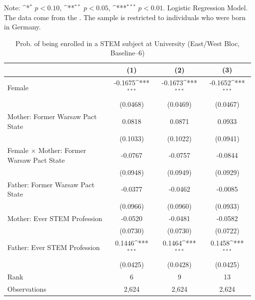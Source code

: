 \documentclass[a4paper, oneside, hyperfootnotes = false]{article}
\def\sym#1{\ifmmode^{#1}\else\(^{#1}\)\fi}
\begin{document}
{\begin{table}[ht]
\begin{center}
		\parbox{10cm}{
			\linespread{1}\footnotesize Note: \sym{*} \(p<0.10\), \sym{**} \(p<0.05\), \sym{***} \(p<0.01\). Logistic Regression Model. The data come from the \cite{SOEP2023}. The sample is restricted to individuals who were born in Germany.}
		
	\end{center}
\end{table}

\begin{table}[ht]
	\caption[STEM subject at University (East/West Bloc, Baseline--6)]{Prob. of being enrolled in a STEM subject at University (East/West Bloc, Baseline--6)}
	\label{tab:extension}
	\begin{center}
		\begin{tabular}{l*{3}{c}}
			\toprule
			&\multicolumn{1}{c}{(1)}         &\multicolumn{1}{c}{(2)}         &\multicolumn{1}{c}{(3)}         \\
			\midrule
			Female              &     -0.1675\sym{***}&     -0.1673\sym{***}&     -0.1652\sym{***}\\
			&    (0.0468)         &    (0.0469)         &    (0.0467)         \\
			\addlinespace
			Mother: Former Warsaw Pact State&      0.0818         &      0.0871         &      0.0933         \\
			&    (0.1033)         &    (0.1022)         &    (0.0941)         \\
			\addlinespace
			Female $\times$ Mother: Former Warsaw Pact State&     -0.0767         &     -0.0757         &     -0.0844         \\
			&    (0.0948)         &    (0.0949)         &    (0.0929)         \\
			\addlinespace
			Father: Former Warsaw Pact State&     -0.0377         &     -0.0462         &     -0.0085         \\
			&    (0.0966)         &    (0.0960)         &    (0.0933)         \\
			\addlinespace
			Mother: Ever STEM Profession&     -0.0520         &     -0.0481         &     -0.0582         \\
			&    (0.0730)         &    (0.0730)         &    (0.0722)         \\
			\addlinespace
			Father: Ever STEM Profession&      0.1446\sym{***}&      0.1464\sym{***}&      0.1458\sym{***}\\
			&    (0.0425)         &    (0.0428)         &    (0.0425)         \\
			\midrule
			Rank                &      6         &      9         &     13         \\
			Observations                  &   2,624         &   2,624         &   2,624         \\
			\bottomrule
		\end{tabular}
		

\end{center}
\end{table}}
\end{document}
